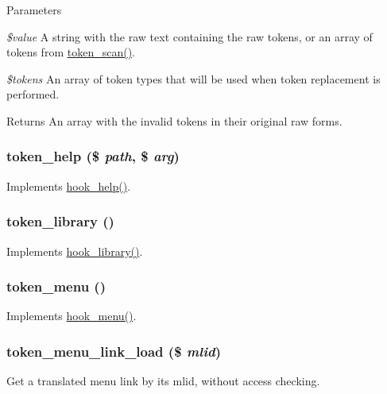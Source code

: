 \begin{DoxyParams}{Parameters}
\item[{\em \$value}]A string with the raw text containing the raw tokens, or an array of tokens from \hyperlink{includes_2token_8inc_a0672a1031161b81dd5aff4476bbc1c99}{token\_\-scan()}. \item[{\em \$tokens}]An array of token types that will be used when token replacement is performed. \end{DoxyParams}
\begin{DoxyReturn}{Returns}
An array with the invalid tokens in their original raw forms. 
\end{DoxyReturn}
\hypertarget{token_8module_a9894cb2ff5f36ce4034e51c75da76de0}{
\subsubsection[{token\_\-help}]{\setlength{\rightskip}{0pt plus 5cm}token\_\-help (\$ {\em path}, \/  \$ {\em arg})}}
\label{token_8module_a9894cb2ff5f36ce4034e51c75da76de0}
Implements \hyperlink{group__hooks_ga5589c2714a782738e8851c4c90231f0e}{hook\_\-help()}. \hypertarget{token_8module_afabac2b6ac5ef102cd598b1b5e940f78}{
\subsubsection[{token\_\-library}]{\setlength{\rightskip}{0pt plus 5cm}token\_\-library ()}}
\label{token_8module_afabac2b6ac5ef102cd598b1b5e940f78}
Implements \hyperlink{group__hooks_ga6bf3f83fa2e373836f5aa78fd143d1cd}{hook\_\-library()}. \hypertarget{token_8module_a91896ab13a2135f6efe2fa63697769b2}{
\subsubsection[{token\_\-menu}]{\setlength{\rightskip}{0pt plus 5cm}token\_\-menu ()}}
\label{token_8module_a91896ab13a2135f6efe2fa63697769b2}
Implements \hyperlink{group__hooks_ga5c95244fea59b25666e409759e133ded}{hook\_\-menu()}. \hypertarget{token_8module_aa10d2e27b2947c29152b40bc0bb3b495}{
\subsubsection[{token\_\-menu\_\-link\_\-load}]{\setlength{\rightskip}{0pt plus 5cm}token\_\-menu\_\-link\_\-load (\$ {\em mlid})}}
\label{token_8module_aa10d2e27b2947c29152b40bc0bb3b495}
Get a translated menu link by its mlid, without access checking.


